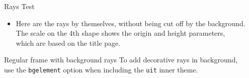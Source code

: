 \begin{frame}{Rays Test}
    \begin{itemize}
        \item Here are the rays by themselves, without being cut off by the background.\\
            The scale on the 4th shape shows the origin and height parameters,\\
            which are based on the title page.
            \medskip

    \end{itemize}
\end{frame}

\begin{frame}{Regular frame with background rays}
    To add decorative rays in background, \\
    use the \texttt{bgelement} option when including the \texttt{uit}
    inner theme.
\end{frame}


